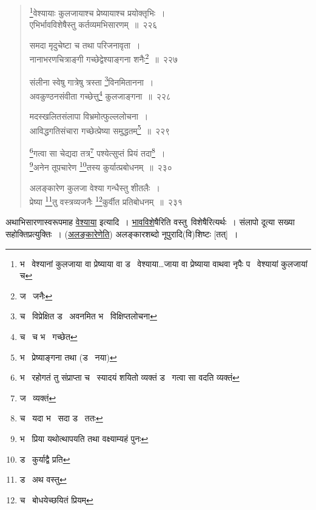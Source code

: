 \documentclass[11pt, openany]{book}
\begin{document}
\newpage

\begin{quote}
{\na \renewcommand{\thefootnote}{1}\footnote{भ \textendash\  वेश्यानां कुलजाया वा प्रेष्याया वा ड \textendash\  वेश्याया\ldots जाया वा प्रेष्याया वाथवा नृपैः प \textendash\  वेश्यायां कुलजायां च}वेश्यायाः कुलजायाश्च प्रेष्यायाश्च प्रयोक्तृभिः~।\\
एभिर्भावविशेषैस्तु कर्तव्यमभिसारणम्~॥~२२६

समदा मृदुचेष्टा च तथा परिजनावृता~।\\
नानाभरणचित्राङ्गी गच्छेद्वेश्याङ्गना शनैः\renewcommand{\thefootnote}{2}\footnote{ज \textendash\  जनैः}~॥~२२७

संलीना स्वेषु गात्रेषु त्रस्ता \renewcommand{\thefootnote}{3}\footnote{च \textendash\  विप्रेक्षित ड \textendash\  अवनमित भ \textendash\  विक्षिप्तलोचना}विनमितानना~।\\
अवकुण्ठनसंवीता गच्छेत्तु\renewcommand{\thefootnote}{4}\footnote{च \textendash\  च भ \textendash\  गच्छेत} कुलजाङ्गना~॥~२२८

मदस्खलितसंलापा विभ्रमोत्फुल्ललोचना~।\\
आविद्धगतिसंचारा गच्छेत्प्रेष्या समुद्धतम्\renewcommand{\thefootnote}{5}\footnote{भ \textendash\  प्रेष्याङ्गना तथा (ड \textendash\  नया)}~॥~२२९

\renewcommand{\thefootnote}{6}\footnote{भ \textendash\  रहोगतं तु संप्राप्ता च \textendash\  स्यादयं शयितो व्यक्तं ड \textendash\  गत्वा सा वदति व्यक्तं}गत्वा सा चेद्यदा तत्र\renewcommand{\thefootnote}{7}\footnote{ज \textendash\  व्यक्तं} पश्येत्सुप्तं प्रियं तदा\renewcommand{\thefootnote}{8}\footnote{च \textendash\  यदा भ \textendash\  सदा ड \textendash\  ततः}~।\\
\renewcommand{\thefootnote}{9}\footnote{भ \textendash\  प्रिया यथोत्थापयति तथा वक्ष्याम्यहं पुनः}अनेन तूपचारेण \renewcommand{\thefootnote}{10}\footnote{ड \textendash\  कुर्याद्वै प्रति}तस्य कुर्यात्प्रबोधनम्~॥~२३०

अलङ्कारेण कुलजा वेश्या गन्धैस्तु शीतलैः~।\\
प्रेष्या \renewcommand{\thefootnote}{11}\footnote{ड \textendash\  अथ वस्तु}तु वस्त्रव्यजनैः \renewcommand{\thefootnote}{12}\footnote{च \textendash\  बोधयेच्छयितं प्रियम्}कुर्वीत प्रतिबोधनम्~॥~२३१}
\end{quote}

अथाभिसारणास्वरूपमाह \underline{वेश्याया} इत्यादि~। \underline{भावविशे}षैरिति वस्तु\textendash\ विशेषैरित्यर्थः~। संलापो दूत्या सख्या सहोक्तिप्रत्युक्तिः~। (\underline{अलङ्कारेणेति}) अलङ्कारशब्दो नूपुरादि(वि)शिष्टः [तत्]~।
\end{document}
